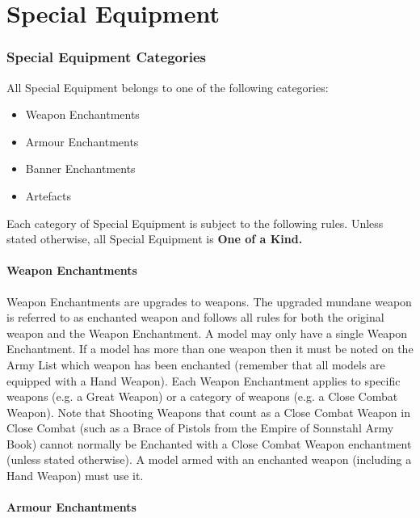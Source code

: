 \part{Special Equipment}
\label{special_equipment}

\section{Special Equipment Categories}

All Special Equipment belongs to one of the following categories:

\begin{itemize}[label={-}]
\item Weapon Enchantments
\item Armour Enchantments
\item Banner Enchantments
\item Artefacts
\end{itemize}

Each category of Special Equipment is subject to the following rules. Unless stated otherwise, all Special Equipment is \textbf{One of a Kind.}

\subsection{Weapon Enchantments}
\label{weapon_enchantments}

Weapon Enchantments are upgrades to weapons. The upgraded mundane weapon is referred to as enchanted weapon and follows all rules for both the original weapon and the Weapon Enchantment. A model may only have a single Weapon Enchantment. If a model has more than one weapon then it must be noted on the Army List which weapon has been enchanted (remember that all models are equipped with a Hand Weapon). Each Weapon Enchantment applies to specific weapons (e.g. a Great Weapon) or a category of weapons (e.g. a Close Combat Weapon). Note that Shooting Weapons that count as a Close Combat Weapon in Close Combat (such as a Brace of Pistols from the Empire of Sonnstahl Army Book) cannot normally be Enchanted with a Close Combat Weapon enchantment (unless stated otherwise). A model armed with an enchanted weapon (including a Hand Weapon) must use it.

\subsection{Armour Enchantments}
\label{armour_enchantments}

